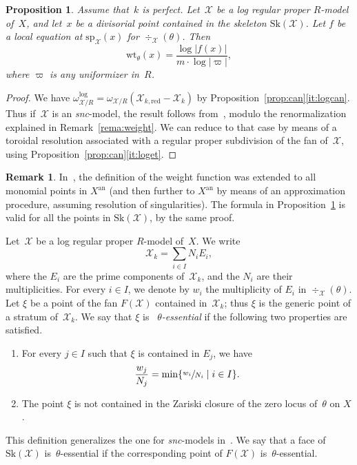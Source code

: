 \documentclass[JEP,XML,SOM,Unicode,NoFloatCountersInSection]{cedram}
\newtheorem{prop}[equation]{Proposition}
\theoremstyle{definition}
\newtheorem{remark}[equation]{Remark}
\numberwithin{equation}{subsection}
\newcommand{\cX}{\ensuremath{\mathscr{X}}}
\newcommand{\snc}{\textit{snc}}
\newcommand{\an}{\mathrm{an}}
\newcommand{\red}{\mathrm{red}}
\newcommand{\Sk}{\mathrm{Sk}}
\newcommand{\spe}{\mathrm{sp}}
\newcommand{\wt}{\mathrm{wt}}
\let\form\theta
\let\unif\varpi
\begin{document}
\begin{prop}\label{prop:logweight} Assume that~$k$ is perfect.
Let~$\cX$ be a log regular proper $R$\nobreakdash-model of~$X$, and let~$x$ be a divisorial point contained in the skeleton $\Sk(\cX)$.
Let $f$ be a local equation at $\spe_{\cX}(x)$ for $\div_{\cX}(\form)$. Then
\[
\wt_{\form}(x)=\frac{\log |f(x)|}{m\cdot \log |\unif|},
\]
where $\unif$ is any uniformizer in~$R$.
\end{prop}
\begin{proof} We have $\omega^{\log}_{\cX/R}=\omega_{\cX/R}(\cX_{k,\red}-\cX_k)$ by Proposition~\ref{prop:can}\eqref{it:logcan}.
Thus if~$\cX$ is an \snc-model, the result follows from~\cite[4.3.7]{MuNi}, modulo the renormalization explained in Remark~\ref{rema:weight}.
We can reduce to that case by means of a toroidal resolution associated with a regular proper subdivision of the fan of~$\cX$, using Proposition~\ref{prop:can}\eqref{it:loget}.
\end{proof}

\begin{remark}
In~\cite{MuNi}, the definition of the weight function was extended to all monomial points in $X^{\an}$ (and then further to $X^{\an}$ by means of an approximation procedure, assuming resolution of singularities). The formula in Proposition~\ref{prop:logweight} is valid for all the points in $\Sk(\cX)$, by the same proof.
\end{remark}

Let~$\cX$ be a log regular proper $R$\nobreakdash-model of~$X$. We write
\[
\cX_k=\sum_{i\in I}N_iE_i,
\]
where the $E_i$ are the prime components of~$\cX_k$, and the $N_i$ are their multiplicities. For every $i\in I$, we denote by $w_i$ the multiplicity of $E_i$ in $\div_{\cX}(\form)$.
Let $\xi$ be a point of the fan $F(\cX)$ contained in~$\cX_k$; thus $\xi$ is the generic point of a stratum of~$\cX_k$.
We say that $\xi$ is {\em~$\form$-essential} if the following two properties are satisfied.
\begin{enumerate}
\item For every $j\in I$ such that $\xi$ is contained in $E_j$, we have
\[
\frac{w_j}{N_j}=\min\{\sfrac{w_i}{N_i}\mid i\in I\}.
\]
\item The point $\xi$ is not contained in the Zariski closure of the zero locus of~$\form$ on $X$.
\end{enumerate}
This definition generalizes the one for \snc-models in~\cite[4.7.4]{MuNi}. We say that a face of $\Sk(\cX)$ is~$\form$-essential if the corresponding point of $F(\cX)$ is~$\form$-essential.
\end{document}
